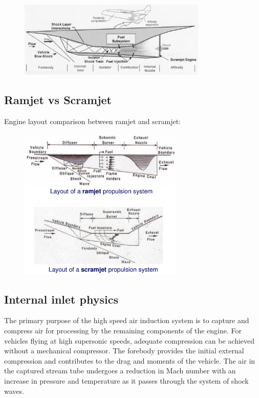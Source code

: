\documentclass[12pt]{article}
\begin{document}
\begin{figure}[!ht]
\centering
\includegraphics[width=0.8\textwidth]{figures/scramjetengine.png}
\end{figure}

\subsection{Ramjet vs Scramjet}

Engine layout comparison between ramjet and scramjet:

\begin{figure}[!ht]
\centering
\includegraphics[width=0.7\textwidth]{figures/ramvsscra.png}
\end{figure}

\subsection{Internal inlet physics}

The primary purpose of the high speed air induction system is to capture and compress air for processing by the remaining components of the engine. For vehicles flying at high supersonic speeds, adequate compression can be achieved without a mechanical compressor. The forebody provides the initial external compression and contributes to the drag and moments of the vehicle. The air in the captured stream tube undergoes a reduction in Mach number with an increase in pressure and temperature as it passes through the system of shock waves.
\end{document}
